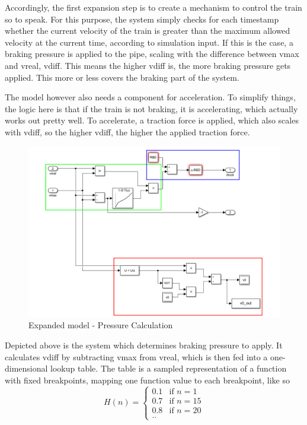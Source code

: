 \par
Accordingly, the first expansion step is to create a mechanism to control the train so to speak. For this purpose, the system simply checks for each timestamp whether the current velocity of the train is greater than the maximum allowed velocity at the current time, according to simulation input. If this is the case, a braking pressure is applied to the pipe, scaling with the difference between vmax and vreal, vdiff. This means the higher vdiff is, the more braking pressure gets applied. This more or less covers the braking part of the system.

\par
The model however also needs a component for acceleration. To simplify things, the logic here is that if the train is not braking, it is accelerating, which actually works out pretty well. To accelerate, a traction force is applied, which also scales with vdiff, so the higher vdiff, the higher the applied traction force.

\begin{figure}[H]
	\centering
	\includegraphics[width=\linewidth]{./pic/expandedmodel_pressure}
	\caption{Expanded model - Pressure Calculation}
	\label{fig:expandedmodel_pressure}
\end{figure}

\par\noindent
Depicted above is the system which determines braking pressure to apply. It calculates vdiff by subtracting vmax from vreal, which is then fed into a one-dimensional lookup table. The table is a sampled representation of a function with fixed breakpoints, mapping one function value to each breakpoint, like so \[
H(n) =
\begin{cases}
0.1 & \text{if $n=1$} \\
0.7 & \text{if $n=15$} \\
0.8 & \text{if $n=20$} \\
\text{..}
\end{cases}
\]

